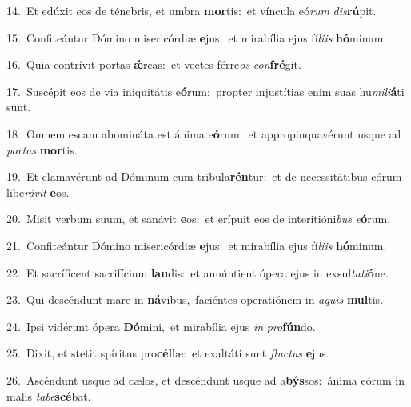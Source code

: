 {\numbfont\textcolor{\numbcolor}{14.}}~Et edúxit eos de ténebris, et umbra \textbf{mor}\-tis:~\star et víncula eó\textit{rum} \textit{dis}\-\textbf{rú}pit.\par
{\numbfont\textcolor{\numbcolor}{15.}}~Confiteántur Dómino misericórdiæ \textbf{e}\-jus:~\star et mirabília ejus fí\-\textit{li}\-\textit{is} \textbf{hó}\-minum.\par
{\numbfont\textcolor{\numbcolor}{16.}}~Quia contrívit portas \textbf{ǽ}\-reas:~\star et vectes férre\textit{os} \textit{con}\-\textbf{fré}git.\par
{\numbfont\textcolor{\numbcolor}{17.}}~Suscépit eos de via iniquitátis e\-\textbf{ó}\-rum:~\star propter injustítias enim suas hu\-\textit{mi}\-\textit{li}\textbf{á}ti sunt.\par
{\numbfont\textcolor{\numbcolor}{18.}}~Omnem escam abomináta est ánima e\-\textbf{ó}\-rum:~\star et appropinquavérunt usque ad \textit{por}\-\textit{tas} \textbf{mor}\-tis.\par
{\numbfont\textcolor{\numbcolor}{19.}}~Et clamavérunt ad Dóminum cum tribula\-\textbf{rén}\-tur:~\star et de necessitátibus eórum libe\-\textit{rá}\-\textit{vit} \textbf{e}\-os.\par
{\numbfont\textcolor{\numbcolor}{20.}}~Misit verbum suum, et sanávit \textbf{e}\-os:~\star et erípuit eos de interitióni\textit{bus} \textit{e}\-\textbf{ó}rum.\par
{\numbfont\textcolor{\numbcolor}{21.}}~Confiteántur Dómino misericórdiæ \textbf{e}\-jus:~\star et mirabília ejus fí\-\textit{li}\-\textit{is} \textbf{hó}\-minum.\par
{\numbfont\textcolor{\numbcolor}{22.}}~Et sacríficent sacrifícium \textbf{lau}\-dis:~\star et annúntient ópera ejus in exsul\-\textit{ta}\-\textit{ti}\textbf{ó}ne.\par
{\numbfont\textcolor{\numbcolor}{23.}}~Qui descéndunt mare in \textbf{ná}\-vibus,~\star faciéntes operatiónem in \textit{a}\-\textit{quis} \textbf{mul}\-tis.\par
{\numbfont\textcolor{\numbcolor}{24.}}~Ipsi vidérunt ópera \textbf{Dó}\-mini,~\star et mirabília ejus \textit{in} \textit{pro}\-\textbf{fún}do.\par
{\numbfont\textcolor{\numbcolor}{25.}}~Dixit, et stetit spíritus pro\-\textbf{cél}\-læ:~\star et exaltáti sunt \textit{fluc}\-\textit{tus} \textbf{e}\-jus.\par
{\numbfont\textcolor{\numbcolor}{26.}}~Ascéndunt usque ad cælos, et descéndunt usque ad a\-\textbf{býs}\-sos:~\star ánima eórum in malis \textit{ta}\-\textit{be}\textbf{scé}bat.\par
